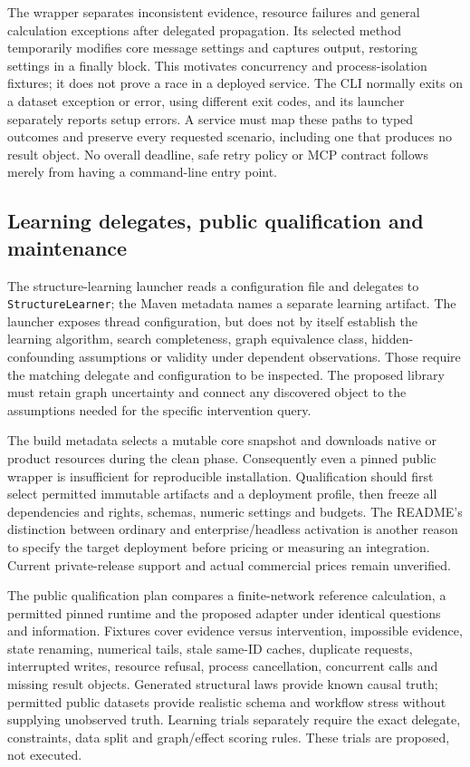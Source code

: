 The wrapper separates inconsistent evidence, resource failures and general
calculation exceptions after delegated propagation. Its selected method
temporarily modifies core message settings and captures output, restoring
settings in a finally block. This motivates concurrency and process-isolation
fixtures; it does not prove a race in a deployed service. The CLI normally
exits on a dataset exception or error, using different exit codes, and its
launcher separately reports setup errors. A service must map these paths to
typed outcomes and preserve every requested scenario, including one that
produces no result object. No overall deadline, safe retry policy or MCP
contract follows merely from having a command-line entry point.
\citep{exec25_agena_source,exec25_agena_choice}

\subsection{Learning delegates, public qualification and maintenance}
The structure-learning launcher reads a configuration file and delegates to
\texttt{StructureLearner}; the Maven metadata names a separate learning
artifact. The launcher exposes thread configuration, but does not by itself
establish the learning algorithm, search completeness, graph equivalence
class, hidden-confounding assumptions or validity under dependent observations.
Those require the matching delegate and configuration to be inspected. The
proposed library must retain graph uncertainty and connect any discovered
object to the assumptions needed for the specific intervention query.
\citep{exec25_agena_source,exec25_agena_choice}

The build metadata selects a mutable core snapshot and downloads native or
product resources during the clean phase. Consequently even a pinned public
wrapper is insufficient for reproducible installation. Qualification should
first select permitted immutable artifacts and a deployment profile, then
freeze all dependencies and rights, schemas, numeric settings and budgets.
The README's distinction between ordinary and enterprise/headless activation
is another reason to specify the target deployment before pricing or measuring
an integration. Current private-release support and actual commercial prices
remain unverified.\citep{exec25_agena_source}

The public qualification plan compares a finite-network reference calculation,
a permitted pinned runtime and the proposed adapter under identical questions
and information. Fixtures cover evidence versus intervention, impossible
evidence, state renaming, numerical tails, stale same-ID caches, duplicate
requests, interrupted writes, resource refusal, process cancellation, concurrent
calls and missing result objects. Generated structural laws provide known
causal truth; permitted public datasets provide realistic schema and workflow
stress without supplying unobserved truth. Learning trials separately require
the exact delegate, constraints, data split and graph/effect scoring rules.
These trials are proposed, not executed.\citep{exec25_agena_choice}


